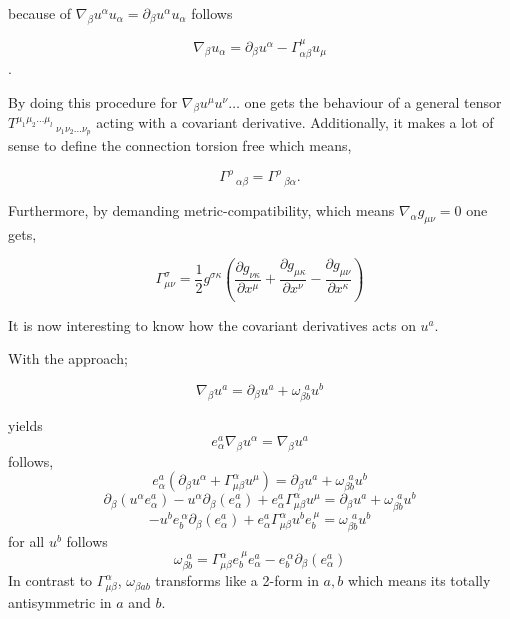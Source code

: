 \documentclass[12pt,a4paper]{article}
\begin{document}
	because of $\nabla_\beta u^\alpha u_\alpha = \partial_\beta u^\alpha u_\alpha$ 
	follows
	
	$$\nabla_\beta u_\alpha = \partial_\beta u^\alpha  -   \Gamma^\mu_{\alpha \beta} u_\mu$$.
	
	By doing this procedure for $\nabla_\beta u^\mu u^\nu \ldots$ one gets the behaviour  of a general tensor  $T^{\mu_1 \mu_2 \ldots \mu_l}\,_{\nu_1 \nu_2 \ldots \nu_p}$ acting with a covariant derivative. Additionally, it makes a lot of sense to define the connection torsion free which means,
	
	$$
	\Gamma^\rho\,_{\alpha \beta} = \Gamma^\rho\,_{\beta \alpha}.
	$$
	
	Furthermore, by demanding metric-compatibility, which means $\nabla_\alpha g_{\mu \nu} = 0$
	one gets,
	
	
	\begin{equation}
		\label{christoffelconnection}
		\Gamma _{{\mu }{\nu }}^{\sigma }={\frac {1}{2}}g^{{\sigma }{\kappa }}\left({\frac {\partial g_{{\nu }{\kappa }}}{\partial x^{\mu }}}+{\frac {\partial g_{{\mu }{\kappa }}}{\partial x^{\nu }}}-{\frac {\partial g_{{\mu }{\nu }}}{\partial x^{\kappa }}}\right)
	\end{equation}
	
	
	It is now interesting to know how the covariant derivatives acts on $u^a$. 
	
	With the approach;
	
	\begin{equation}
		\label{dua}
		\nabla_\beta u^a = \partial_\beta u^a + \omega_{\beta b}^{ \ \ a}u^b
	\end{equation}
	
	yields 
	$$
	e_\alpha^a \nabla_\beta u^\alpha = \nabla_\beta u^a
	$$
	follows,
	$$
	e_\alpha^a \left(  \partial_\beta u^\alpha  +   \Gamma^\alpha_{\mu \beta} u^\mu \right) = \partial_\beta u^a + \omega_{\beta b}^{ \ \ a}u^b
	$$
	$$
	 \partial_\beta(u^\alpha e_\alpha^a) - u^\alpha \partial_\beta (e_\alpha^a) +  e_\alpha^a   \Gamma^\alpha_{\mu \beta} u^\mu  = \partial_\beta u^a + \omega_{\beta b}^{ \ \ a}u^b
	$$
	$$
 - u^b e_b^{\ \alpha} \partial_\beta (e_\alpha^a) +  e_\alpha^a   \Gamma^\alpha_{\mu \beta} u^b e_b^{\ \mu}  =  \omega_{\beta b}^{ \ \ a}u^b
	$$
	for all $u^b$ follows
	$$
	 \omega_{\beta b}^{ \ \ a} = \Gamma^\alpha_{\mu \beta} e_b^{\ \mu} e_\alpha^a    - e_b^{\ \alpha} \partial_\beta (e_\alpha^a)  
	$$
	In contrast to $\Gamma^\alpha_{\mu \beta}$, $\omega_{\beta a b}$ transforms like a 2-form in $a,b$ which means its totally antisymmetric in $a$ and $b$.
	
\end{document}
